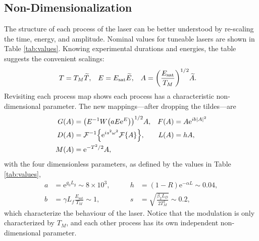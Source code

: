 \documentclass[10pt,twocolumn,a4paper]{article}
\let\originalleft\left
\let\originalright\right
\renewcommand{\left}{\mathopen{}\mathclose\bgroup\originalleft}
\renewcommand{\right}{\aftergroup\egroup\originalright}
\newcommand{\Es}{E_{\textrm{sat}}}
\newcommand{\FT}[1]{\mathcal{F}\left\{ #1 \right\}}
\newcommand{\FTi}[1]{\mathcal{F}^{-1}\left\{ #1 \right\}}
\begin{document}
\subsection{Non-Dimensionalization}
The structure of each process of the laser can be better understood by re-scaling the time, energy, and amplitude. Nominal values for tuneable lasers are shown in Table \ref{tab:values}. Knowing experimental durations and energies, the table suggests the convenient scalings:
\begin{align}
	T &= T_M \widetilde{T},& E &= \Es \widetilde{E},& A &= \left( \frac{\Es}{T_M} \right)^{1/2} \widetilde{A}.
\end{align}
Revisiting each process map shows each process has a characteristic non-dimensional parameter. The new mappings---after dropping the tildes---are
\begin{equation}
\begin{aligned}
G(A) &= \left(E^{-1} W \left( a E \textrm{e}^{E}\right) \right)^{1/2} A, & F(A) &= A \textrm{e}^{i b |A|^2} \\
D(A) &= \FTi{\textrm{e}^{i s^2 \omega^2} \FT{A}}, & L(A) &= h A, \\
M(A) &= \textrm{e}^{-T^2 / 2} A,
\label{eq:effects}
\end{aligned}
\end{equation}
with the four dimensionless parameters, as defined by the values in Table \ref{tab:values},
\begin{equation}
\begin{aligned}
	a &= \textrm{e}^{g_0 L_g} \sim 8 \times 10^3,& \qquad h &= (1 - R) \textrm{e}^{-\alpha L} \sim 0.04, \\
	b &= \gamma L_f \frac{\Es}{T_M} \sim 1,& \qquad s &= \sqrt{\frac{\beta_2 L_D}{2 T_M^2}} \sim 0.2,
\label{eq:ndparam}
\end{aligned}
\end{equation}
which characterize the behaviour of the laser. Notice that the modulation is only characterized by $T_M$, and each other process has its own independent non-dimensional parameter.
\end{document}
